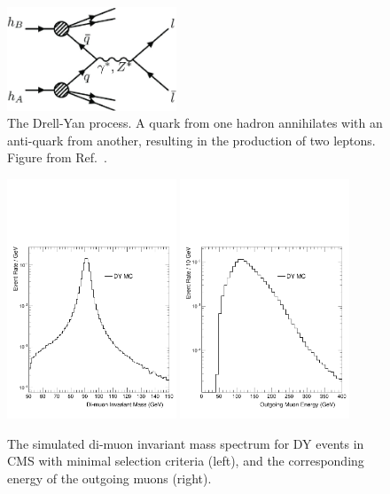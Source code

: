\begin{figure}[ht]
	\centering
	\includegraphics[width=0.45\textwidth]{figures/dyProcess.pdf}
	\caption[Feynman Diagram for the DY Process]{The Drell-Yan process. A quark from one hadron annihilates with an anti-quark from another, resulting in the production of two leptons. Figure from Ref.~\cite{bechtel2023}.}
	\label{fig:dyDiagram}
\end{figure}

\begin{figure}[ht]
	\centering
	\includegraphics[width=0.45\textwidth]{figures/dyMuSpectrum.pdf}
	\hspace{0.01\textwidth}
	\includegraphics[width=0.45\textwidth]{figures/dyMuEnergy.pdf}
	\caption[DY Process Di-muon Invariant Mass and Outgoing Muon Energy]{The simulated di-muon invariant mass spectrum for DY events in CMS with minimal selection criteria (left), and the corresponding energy of the outgoing muons (right).}
	\label{fig:dySpectrum}
\end{figure}


